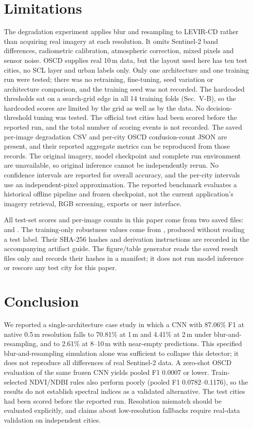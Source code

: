\documentclass[conference]{IEEEtran}
\begin{document}
\section{Limitations}
The degradation experiment applies blur and resampling to LEVIR-CD rather than
acquiring real imagery at each resolution. It omits Sentinel-2 band differences,
radiometric calibration, atmospheric correction, mixed pixels and sensor noise.
OSCD supplies real 10\,m data, but the layout used here has ten test cities, no
SCL layer and urban labels only. Only one architecture and one training run were
tested; there was no retraining, fine-tuning, seed variation or architecture
comparison, and the training seed was not recorded. The hardcoded thresholds sat on a search-grid edge in all 14
training folds (Sec.~V-B), so the hardcoded scores are limited by the grid as
well as by the data. No decision-threshold tuning was tested. The
official test cities had been scored before the reported run, and the total
number of scoring events is not recorded. The saved per-image degradation CSV
and per-city OSCD confusion-count JSON are present, and their reported
aggregate metrics can be reproduced from those records. The original imagery,
model checkpoint and complete run environment are unavailable, so original
inference cannot be independently rerun. No confidence intervals are reported
for overall accuracy, and the per-city intervals use an independent-pixel
approximation. The reported benchmark evaluates a historical offline pipeline
and frozen checkpoint, not the current application's imagery retrieval, RGB
screening, exports or user interface.

All test-set scores and per-image counts in this paper come from two saved
files:  and
. The training-only robustness
values come from , produced
without reading a test label. Their SHA-256 hashes and derivation instructions
are recorded in the accompanying artifact guide. The figure/table generator
reads the saved result files only and records their hashes in a manifest; it
does not run model inference or rescore any test city for this paper.

\section{Conclusion}
We reported a single-architecture case study in which a CNN with 87.06\% F1 at
native 0.5\,m resolution falls to 70.81\% at 1\,m and 4.41\% at 2\,m under
blur-and-resampling, and to 2.61\% at 8--10\,m with near-empty predictions.
This specified blur-and-resampling simulation alone was sufficient to collapse
this detector; it does not reproduce all differences of real Sentinel-2 data.
A zero-shot OSCD evaluation of the same frozen CNN yields
pooled F1 0.0007 or lower. Train-selected NDVI/NDBI rules also perform poorly
(pooled F1 0.0782--0.1176), so the results do not establish spectral indices as
a validated alternative. The test cities had been scored before the reported
run. Resolution mismatch should be evaluated explicitly, and claims about
low-resolution fallbacks require real-data validation on independent cities.
\end{document}
